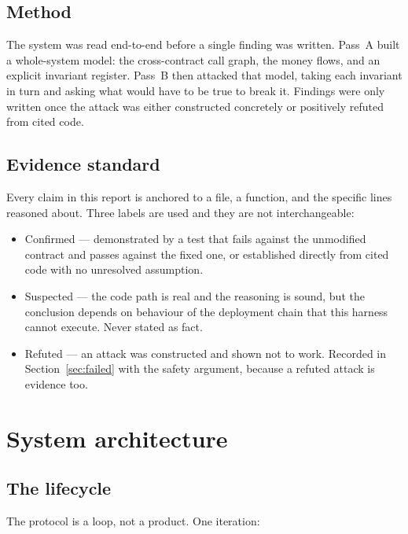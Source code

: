\documentclass[11pt,a4paper]{article}
\newcommand{\Conf}{\textcolor{critical}{Confirmed}}
\newcommand{\Susp}{\textcolor{medium}{Suspected}}
\newcommand{\Refu}{\textcolor{good}{Refuted}}
\begin{document}
\subsection{Method}

The system was read end-to-end before a single finding was written. Pass~A built
a whole-system model: the cross-contract call graph, the money flows, and an
explicit invariant register. Pass~B then attacked that model, taking each
invariant in turn and asking what would have to be true to break it. Findings
were only written once the attack was either constructed concretely or
positively refuted from cited code.

\subsection{Evidence standard}

Every claim in this report is anchored to a file, a function, and the specific
lines reasoned about. Three labels are used and they are not interchangeable:

\begin{itemize}
\item \Conf{} --- demonstrated by a test that fails against the unmodified
contract and passes against the fixed one, or established directly from cited
code with no unresolved assumption.
\item \Susp{} --- the code path is real and the reasoning is sound, but the
conclusion depends on behaviour of the deployment chain that this harness cannot
execute. Never stated as fact.
\item \Refu{} --- an attack was constructed and shown not to work. Recorded in
Section~\ref{sec:failed} with the safety argument, because a refuted attack is
evidence too.
\end{itemize}

\newpage
\section{System architecture}
\label{sec:arch}

\subsection{The lifecycle}

The protocol is a loop, not a product. One iteration:
\end{document}
